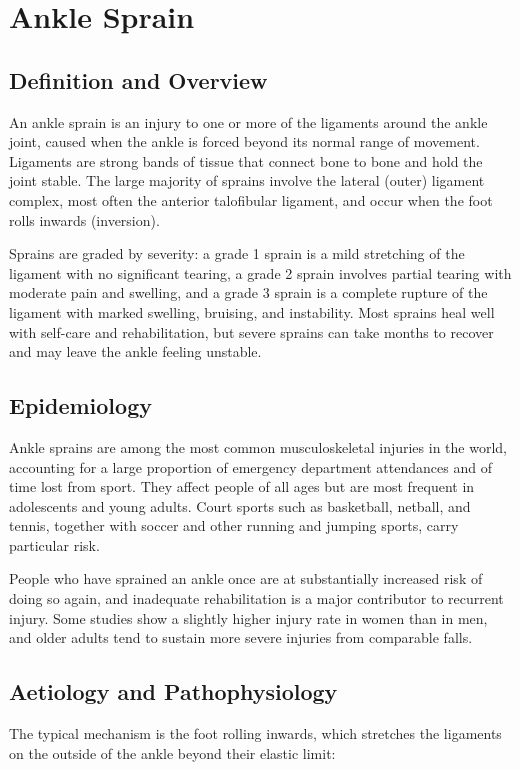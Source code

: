\chapter{Ankle Sprain}

\section*{Definition and Overview}
An ankle sprain is an injury to one or more of the ligaments around the ankle joint, caused when the ankle is forced beyond its normal range of movement. Ligaments are strong bands of tissue that connect bone to bone and hold the joint stable. The large majority of sprains involve the lateral (outer) ligament complex, most often the anterior talofibular ligament, and occur when the foot rolls inwards (inversion).

Sprains are graded by severity: a grade 1 sprain is a mild stretching of the ligament with no significant tearing, a grade 2 sprain involves partial tearing with moderate pain and swelling, and a grade 3 sprain is a complete rupture of the ligament with marked swelling, bruising, and instability. Most sprains heal well with self-care and rehabilitation, but severe sprains can take months to recover and may leave the ankle feeling unstable.

\section*{Epidemiology}
Ankle sprains are among the most common musculoskeletal injuries in the world, accounting for a large proportion of emergency department attendances and of time lost from sport. They affect people of all ages but are most frequent in adolescents and young adults. Court sports such as basketball, netball, and tennis, together with soccer and other running and jumping sports, carry particular risk.

People who have sprained an ankle once are at substantially increased risk of doing so again, and inadequate rehabilitation is a major contributor to recurrent injury. Some studies show a slightly higher injury rate in women than in men, and older adults tend to sustain more severe injuries from comparable falls.

\section*{Aetiology and Pathophysiology}
The typical mechanism is the foot rolling inwards, which stretches the ligaments on the outside of the ankle beyond their elastic limit:

